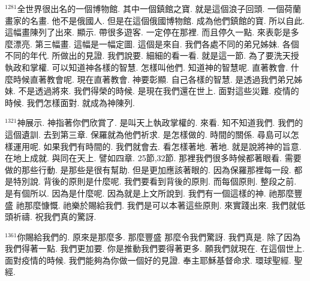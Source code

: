 \documentclass{book}
\begin{document}
$^{1281}$全世界很出名的一個博物館.
其中一個鎮館之寶.
就是這個浪子回頭.
一個荷蘭畫家的名畫.
他不是俄國人.
但是在這個俄國博物館.
成為他們鎮館的寶.
所以自此.
這幅畫陳列了出來.
顯示.
帶很多遊客.
一定停在那裡.
而且停久一點.
來表彰是多麼漂亮.
第三幅畫.
這幅是一幅定圖.
這個是來自.
我們各處不同的弟兄姊妹.
各個不同的年代.
所做出的見證.
我們說要.
細細的看一看.
就是這一節.
為了要洗天授執政和掌權.
可以知道神各樣的智慧.
怎樣叫他們.
知道神的智慧呢.
直著教會.
什麼時候直著教會呢.
現在直著教會.
神要彰顯.
自己各樣的智慧.
是透過我們弟兄姊妹.
不是透過將來.
我們得榮的時候.
是現在我們還在世上.
面對這些災難.
疫情的時候.
我們怎樣面對.
就成為神陳列.

$^{1321}$神展示.
神指著你們欣賞了.
是叫天上執政掌權的.
來看.
知不知道我們.
我們的這個遺訓.
去到第三章.
保羅就為他們祈求.
是怎樣做的.
時間的關係.
尋島可以怎樣運用呢.
如果我們有時間的.
我們就會去.
看怎樣著地.
著地.
就是說將神的旨意.
在地上成就.
與同在天上.
譬如四章.
25節,32節.
那裡我們很多時候都著眼看.
需要做的那些行動.
是那些是很有幫助.
但是更加應該著眼的.
因為保羅那裡每一段.
都是特別說.
背後的原則是什麼呢.
我們要看到背後的原則.
而每個原則.
整段之前.
是有個所以.
因為是什麼呢.
因為就是上文所說到.
我們有一個這樣的神.
祂那麼豐盛 祂那麼慷慨.
祂樂於賜給我們.
我們是可以本著這些原則.
來實踐出來.
我們就低頭祈禱.
祝我們真的驚訝.

$^{1361}$你賜給我們的.
原來是那麼多.
那麼豐盛 那麼令我們驚訝.
我們真是.
除了因為我們得著一點.
我們更加要.
你是推動我們要得著更多.
願我們就現在.
在這個世上.
面對疫情的時候.
我們能夠為你做一個好的見證.
奉主耶穌基督命求.
環球聖經.
聖經.
\newpage
\end{document}
